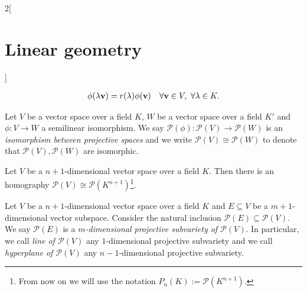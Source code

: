 \documentclass[../../../main.tex]{subfiles}
\begin{document}
\begin{multicols}{2}[\section{Linear geometry}]
\begin{definition}
\begin{gather*}
            \phi(\lambda \boldsymbol{\mathrm{v}})=r(\lambda)\phi(\boldsymbol{\mathrm{v}})\quad \forall \boldsymbol{\mathrm{v}}\in V,\ \forall\lambda\in K.
        \end{gather*}
    \end{definition}
    \begin{definition}
        Let $V$ be a vector space over a field $K$, $W$ be a vector space over a field $K'$ and $\phi:V\rightarrow W$ a semilinear isomorphism. We say $\mathcal{P}(\phi):\mathcal{P}(V)\rightarrow\mathcal{P}(W)$ is an \textit{isomorphism between projective spaces} and we write $\mathcal{P}(V)\cong \mathcal{P}(W)$ to denote that $\mathcal{P}(V),\mathcal{P}(W)$ are isomorphic.
    \end{definition}
    \begin{prop}
        Let $V$ be a $n+1$-dimensional vector space over a field $K$. Then there is an homography $\mathcal{P}(V)\cong \mathcal{P}(K^{n+1})$\footnote{From now on we will use the notation $P_n(K):=\mathcal{P}(K^{n+1})$.}.
    \end{prop}
    \begin{definition}
        Let $V$ be a $n+1$-dimensional vector space over a field $K$ and $E\subseteq V$ be a $m+1$-dimensional vector subspace. Consider the natural inclusion $\mathcal{P}(E)\subseteq\mathcal{P}(V)$. We say $\mathcal{P}(E)$ is a \textit{$m$-dimensional projective subvariety of $\mathcal{P}(V)$}. In particular, we call \textit{line of $\mathcal{P}(V)$} any $1$-dimensional projective subvariety and we call \textit{hyperplane of $\mathcal{P}(V)$} any $n-1$-dimensional projective subvariety.
    \end{definition}

\end{multicols}
\end{document}
